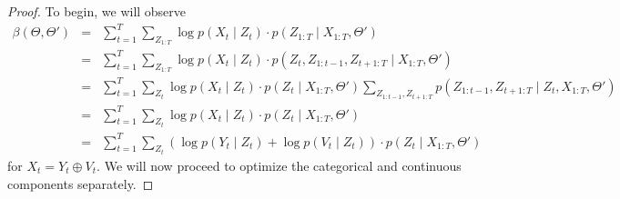 \documentclass{amsart}
\begin{document}
\begin{proof}
To begin, we will observe 
\begin{eqnarray*}
\beta(\Theta,\Theta') &=& \sum_{t=1}^T\sum_{Z_{1:T}}\log p(X_t\mid 
Z_t)\cdot p(Z_{1:T}\mid X_{1:T},\Theta')\\
&=& \sum_{t=1}^T\sum_{Z_{1:T}}\log p(X_t\mid Z_t)\cdot 
p(Z_t,Z_{1:t-1},Z_{t+1:T}\mid X_{1:T},\Theta')\\
&=& \sum_{t=1}^T\sum_{Z_t}\log p(X_t\mid Z_t)\cdot p(Z_t\mid 
X_{1:T},\Theta')\sum_{Z_{1:t-1},Z_{t+1:T}}p(Z_{1:t-1},Z_{t+1:T}\mid 
Z_t,X_{1:T},\Theta')\\
&=& \sum_{t=1}^T\sum_{Z_t}\log p(X_t\mid Z_t)\cdot p(Z_t\mid X_{1:T},\Theta')\\
&=& \sum_{t=1}^T\sum_{Z_t}\left(\log p(Y_t\mid Z_t)+\log p(V_t\mid 
Z_t)\right)\cdot p(Z_t\mid X_{1:T},\Theta')
\end{eqnarray*}
for $X_t=Y_t\oplus V_t$.  We will now proceed to optimize the categorical and continuous components separately.


\end{proof}
\end{document}
